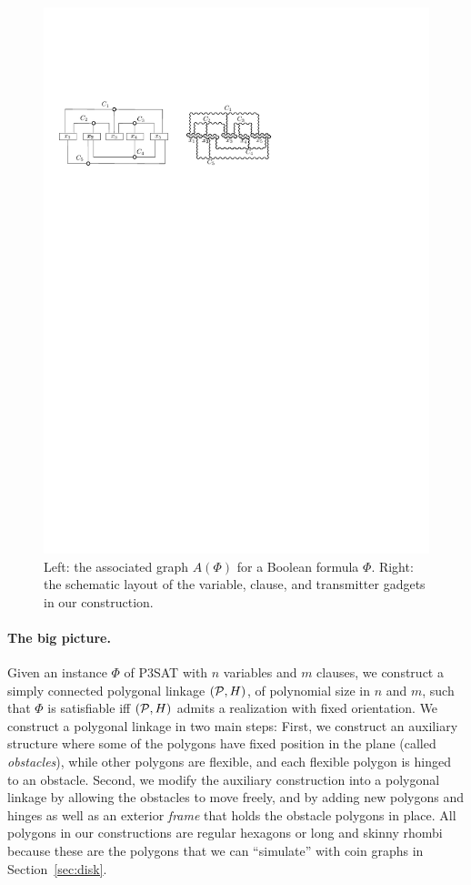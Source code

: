 \documentclass[runningheads]{article}
\newcommand{\PP}{{\cal P}} %
\begin{document}
\begin{figure}[htbp]
	\centering
	\includegraphics[width=0.7\columnwidth]{fig-assoc-hex}
	\caption[]{Left: the associated graph $A(\Phi)$ for a Boolean formula $\Phi$.
Right: the schematic layout of the variable, clause, and transmitter gadgets in our construction.}
	\label{fig:assoc}
\end{figure}

\paragraph{The big picture.}
Given an instance $\Phi$ of P3SAT with $n$ variables and $m$ clauses, we construct a simply connected polygonal linkage $(\PP,H)$, of polynomial size in $n$ and $m$, such that $\Phi$ is satisfiable iff $(\PP,H)$ admits a realization with fixed orientation. We construct a polygonal linkage  in two main steps: First, we construct an auxiliary structure where some of the polygons have fixed position in the plane (called \emph{obstacles}), while other polygons are flexible, and each flexible polygon is hinged to an obstacle. Second, we modify the auxiliary construction into a polygonal linkage by allowing the obstacles to move freely, and by adding new polygons and hinges as well as an exterior \emph{frame} that holds the obstacle polygons in place. All polygons in our constructions are regular hexagons or long and skinny rhombi because these are the polygons that we can ``simulate'' with coin graphs in Section~\ref{sec:disk}.
\end{document}
